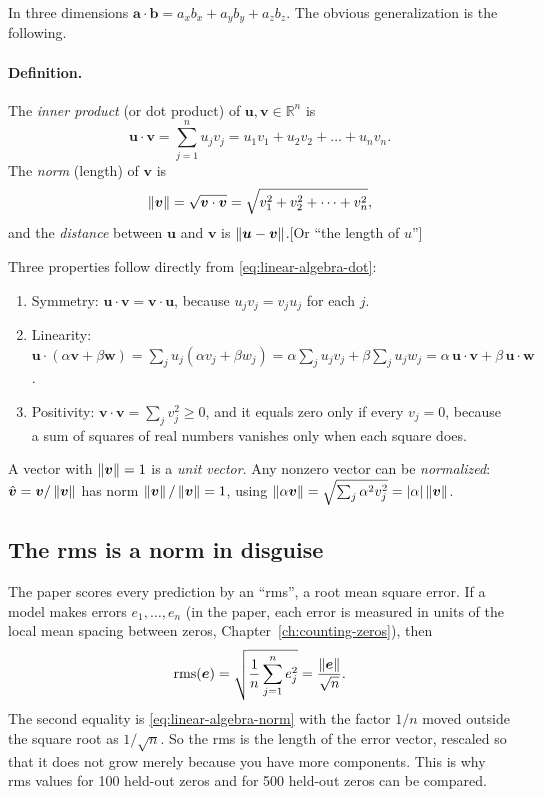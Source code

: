 In three dimensions $\bm a\cdot\bm b=a_xb_x+a_yb_y+a_zb_z$. The obvious generalization is the following.

\paragraph{Definition.} The \emph{inner product} (or dot product) of $\bm u,\bm v\in\mathbb R^n$ is
\begin{equation}
\bm u\cdot\bm v=\sum_{j=1}^{n}u_jv_j=u_1v_1+u_2v_2+\dots+u_nv_n .
\label{eq:linear-algebra-dot}
\end{equation}
The \emph{norm} (length) of $\bm v$ is
\begin{equation}
\left\lVert \bm v\right\rVert=\sqrt{\bm v\cdot\bm v}=\sqrt{v_1^2+v_2^2+\dots+v_n^2},
\label{eq:linear-algebra-norm}
\end{equation}
and the \emph{distance} between $\bm u$ and $\bm v$ is $\left\lVert \bm u-\bm v\right\rVert$.[Or ``the length of $u$'']

Three properties follow directly from \cref{eq:linear-algebra-dot}:
\begin{enumerate}
\item Symmetry: $\bm u\cdot\bm v=\bm v\cdot\bm u$, because $u_jv_j=v_ju_j$ for each $j$.
\item Linearity: $\bm u\cdot(\alpha\bm v+\beta\bm w)=\sum_ju_j(\alpha v_j+\beta w_j)=\alpha\sum_ju_jv_j+\beta\sum_ju_jw_j=\alpha\,\bm u\cdot\bm v+\beta\,\bm u\cdot\bm w$.
\item Positivity: $\bm v\cdot\bm v=\sum_jv_j^2\ge0$, and it equals zero only if every $v_j=0$, because a sum of squares of real numbers vanishes only when each square does.
\end{enumerate}
A vector with $\left\lVert \bm v\right\rVert=1$ is a \emph{unit vector}. Any nonzero vector can be \emph{normalized}: $\hat{\bm v}=\bm v/\left\lVert \bm v\right\rVert$ has norm $\left\lVert \bm v\right\rVert/\left\lVert \bm v\right\rVert=1$, using $\left\lVert \alpha\bm v\right\rVert=\sqrt{\sum_j\alpha^2v_j^2}=\left\lvert \alpha\right\rvert\left\lVert \bm v\right\rVert$.

\subsection{The rms is a norm in disguise}

The paper scores every prediction by an ``rms'', a root mean square error. If a model makes errors $e_1,\dots,e_n$ (in the paper, each error is measured in units of the local mean spacing between zeros, Chapter~\ref{ch:counting-zeros}), then
\begin{equation}
\mathrm{rms}(\bm e)=\sqrt{\frac1n\sum_{j=1}^ne_j^2}=\frac{\left\lVert \bm e\right\rVert}{\sqrt n}.
\label{eq:linear-algebra-rms}
\end{equation}
The second equality is \cref{eq:linear-algebra-norm} with the factor $1/n$ moved outside the square root as $1/\sqrt n$. So the rms is the length of the error vector, rescaled so that it does not grow merely because you have more components. This is why rms values for 100 held-out zeros and for 500 held-out zeros can be compared.

